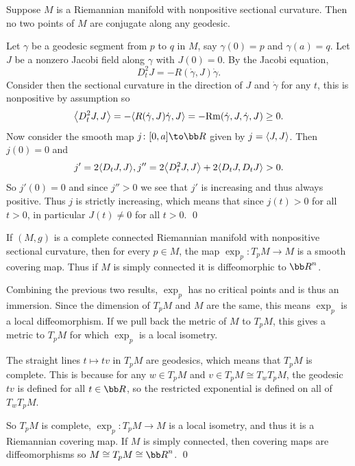 \eproof

\blemm

    Suppose $M$ is a Riemannian manifold with nonpositive sectional curvature.
    Then no two points of $M$ are conjugate along any geodesic.

\elemm

\bproof

    Let $\gamma$ be a geodesic segment from $p$ to $q$ in $M$, say $\gamma(0)=p$ and $\gamma(a)=q$.
    Let $J$ be a nonzero Jacobi field along $\gamma$ with $J(0)=0$.
    By the Jacobi equation,
    $$ D_t^2J = -R(\dot\gamma,J)\dot\gamma . $$
    Consider then the sectional curvature in the direction of $J$ and $\dot\gamma$ for any $t$, this is nonpositive by assumption so
    $$ \mathopen{}\mathclose{\left<D_t^2J,J\right>} = -\mathopen{}\mathclose{\left<R(\dot\gamma,J)\dot\gamma,J\right>} = -{\rm Rm}(\dot\gamma,J,\dot\gamma,J) \geq 0 . $$
    Now consider the smooth map $j\colon [0,a]\to\bR$ given by $j=\mathopen{}\mathclose{\left<J,J\right>}$.
    Then $j(0)=0$ and
    $$ j' = 2\mathopen{}\mathclose{\left<D_tJ,J\right>} , j'' = 2\mathopen{}\mathclose{\left<D_t^2J,J\right>} + 2\mathopen{}\mathclose{\left<D_tJ,D_tJ\right>} > 0 . $$
    So $j'(0)=0$ and since $j''>0$ we see that $j'$ is increasing and thus always positive.
    Thus $j$ is strictly increasing, which means that since $j(t)>0$ for all $t>0$, in particular $J(t)\neq0$ for all $t>0$.
    \qed

\eproof

\bthrm[title=Hadamard]

    If $(M,g)$ is a complete connected Riemannian manifold with nonpositive sectional curvature, then for every $p\in M$, the map
    $\exp_p\colon T_pM\to M$ is a smooth covering map.
    Thus if $M$ is simply connected it is diffeomorphic to $\bR^n$.

\ethrm

\bproof

    Combining the previous two results, $\exp_p$ has no critical points and is thus an immersion.
    Since the dimension of $T_pM$ and $M$ are the same, this means $\exp_p$ is a local diffeomorphism.
    If we pull back the metric of $M$ to $T_pM$, this gives a metric to $T_pM$ for which $\exp_p$ is a local isometry.

    The straight lines $t\mapsto tv$ in $T_pM$ are geodesics, which means that $T_pM$ is complete.
    This is because for any $w\in T_pM$ and $v\in T_pM\cong T_wT_pM$, the geodesic $tv$ is defined for all $t\in\bR$, so the restricted exponential
    is defined on all of $T_wT_pM$.

    So $T_pM$ is complete, $\exp_p\colon T_pM\to M$ is a local isometry, and thus it is a Riemannian covering map.
    If $M$ is simply connected, then covering maps are diffeomorphisms so $M\cong T_pM\cong\bR^n$.
    \qed

